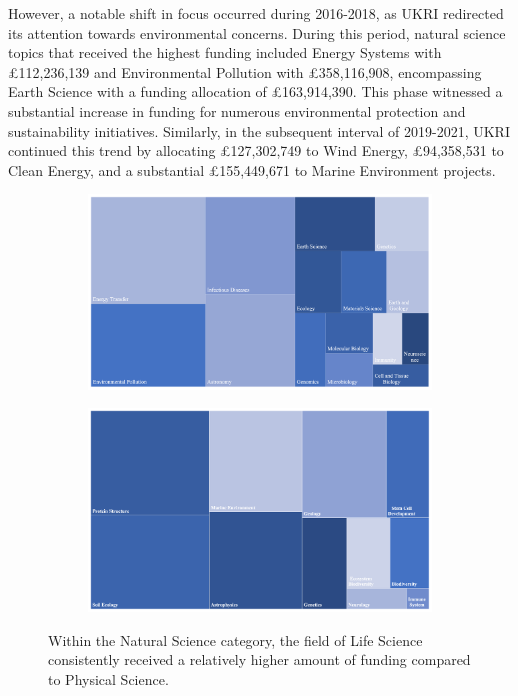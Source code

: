 However, a notable shift in focus occurred during 2016-2018, as UKRI redirected its attention towards environmental concerns. During this period, natural science topics that received the highest funding included Energy Systems with £112,236,139 and Environmental Pollution with £358,116,908, encompassing Earth Science with a funding allocation of £163,914,390. This phase witnessed a substantial increase in funding for numerous environmental protection and sustainability initiatives. Similarly, in the subsequent interval of 2019-2021, UKRI continued this trend by allocating £127,302,749 to Wind Energy, £94,358,531 to Clean Energy, and a substantial £155,449,671 to Marine Environment projects.\\


\begin{figure}[H]
    \centering

    \begin{subfigure}{\textwidth}
        \includegraphics[width=\textwidth]{Figures/Overview of Natural Science Projects Funded in 2016-2018.png}

    \end{subfigure}
    \begin{subfigure}{\textwidth}
        \includegraphics[width=\textwidth]{Figures/Overview of Natural Science Projects Funded in 2019-2021.png}

    \end{subfigure}
    \caption[Investment Directions within Natural Science (2013-2015 and 2016-2018)]{Within the Natural Science category, the field of Life Science consistently received a relatively higher amount of funding compared to Physical Science.}
    \label{fig3.6}
\end{figure}
